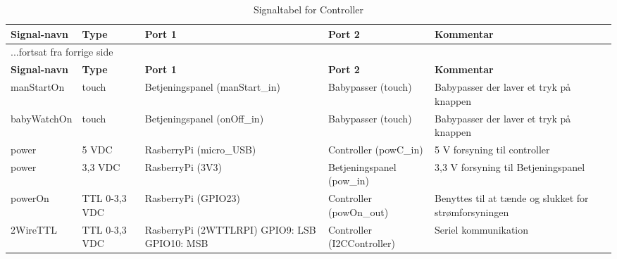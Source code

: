 \begin{center}
\begin{longtable}{|p{}|p{}|p{}|p{}|p{3cm}|}
\caption{Signaltabel for Controller}\\
\hline
\textbf{Signal-navn}	&\textbf{Type} 		&\textbf{Port 1} 	&\textbf{Port 2} 			&\textbf{Kommentar} \\ \hline
\endfirsthead
\multicolumn{5}{l}{...fortsat fra forrige side} \\ \hline 
\textbf{Signal-navn}	&\textbf{Type} 		&\textbf{Port 1} 	&\textbf{Port 2} 			&\textbf{Kommentar} \\ \hline
\endhead


manStartOn
&touch
&Betjeningspanel \newline (manStart\_in)
&Babypasser \newline (touch)
&Babypasser der laver et tryk på knappen
\\\hline

babyWatchOn
&touch
&Betjeningspanel \newline (onOff\_in)
&Babypasser \newline (touch)
&Babypasser der laver et tryk på knappen
\\\hline

power
&5 VDC
&RasberryPi \newline(micro\_USB) 
&Controller \newline(powC\_in)
&5 V forsyning til controller
\\\hline
power
&3,3 VDC
&RasberryPi \newline(3V3) 
&Betjeningspanel \newline (pow\_in)
&3,3 V forsyning til Betjeningspanel
\\\hline


powerOn			
&TTL 0-3,3 VDC	
&RasberryPi \newline (GPIO23)				
&Controller \newline (powOn\_out) 			
&Benyttes til at tænde og slukket for strømforsyningen   				\\\hline

2WireTTL		
&TTL 0-3,3 VDC			
&RasberryPi \newline (2WTTLRPI) \newline	
	GPIO9: LSB \newline	
	GPIO10: MSB \newline	
&Controller \newline (I2CController) 			
&Seriel kommunikation
\\\hline


\end{longtable}
\end{center}

